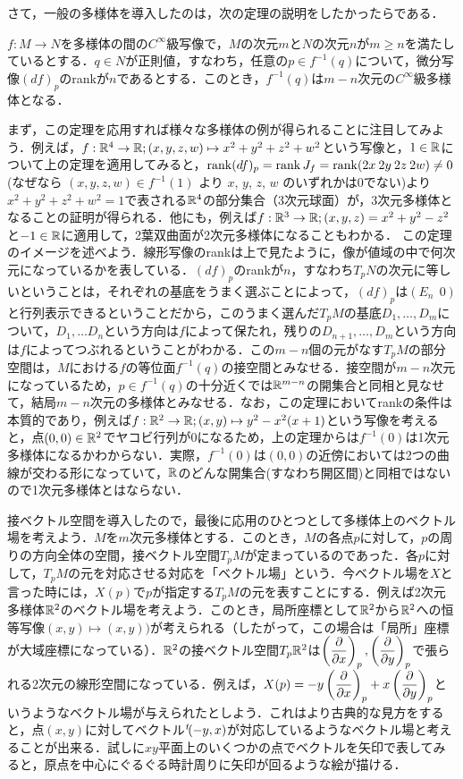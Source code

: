 さて，一般の多様体を導入したのは，次の定理の説明をしたかったらである．
\begin{s_theo}
$f:M\rightarrow N$を多様体の間の$C^\infty$級写像で，$M$の次元$m$と$N$の次元$n$が$m\ge n$を満たしているとする．$q\in N$が正則値，すなわち，任意の$p\in f^{-1}(q)$について，微分写像$(df)_p$のrankが$n$であるとする．このとき，$f^{-1}(q)$は$m-n$次元の$C^{\infty}$級多様体となる．
\end{s_theo}
まず，この定理を応用すれば様々な多様体の例が得られることに注目してみよう．例えば，$f:{\mathbb R}^4 \rightarrow {\mathbb R};(x,y,z,w)\mapsto x^2+y^2+z^2+w^2$という写像と，$1\in {\mathbb R}$について上の定理を適用してみると，$\operatorname{rank}(df)_p=\operatorname{rank} J_{f}=\operatorname{rank}(2x\:2y\:2z\:2w)\neq 0$ (なぜなら $(x,y,z,w)\in f^{-1}(1)$ より $x$, $y$, $z$, $w$ のいずれかは0でない)より$x^2+y^2+z^2+w^2=1$で表される${\mathbb R}^4$の部分集合（3次元球面）が，3次元多様体となることの証明が得られる．他にも，例えば$f:{\mathbb R}^3\rightarrow {\mathbb R};(x,y,z)=x^2+y^2-z^2$と$-1\in{\mathbb R}$に適用して，2葉双曲面が2次元多様体になることもわかる．
この定理のイメージを述べよう．線形写像のrankは上で見たように，像が値域の中で何次元になっているかを表している．$(df)_p$のrankが$n$，すなわち$T_pN$の次元に等しいということは，それぞれの基底をうまく選ぶことによって，$(df)_p$は$(E_n\:\:0)$と行列表示できるということだから，このうまく選んだ$T_pM$の基底$D_1,\dots,D_m$について，$D_1,\dots D_n$という方向は$f$によって保たれ，残りの$D_{n+1},\dots,D_m$という方向は$f$によってつぶれるということがわかる．この$m-n$個の元がなす$T_pM$の部分空間は，$M$における$f$の等位面$f^{-1}(q)$の接空間とみなせる．接空間が$m-n$次元になっているため，$p\in f^{-1}(q)$の十分近くでは${\mathbb R}^{m-n}$の開集合と同相と見なせて，結局$m-n$次元の多様体とみなせる．なお，この定理においてrankの条件は本質的であり，例えば$f:{\mathbb R}^2\rightarrow{\mathbb R};(x,y)\mapsto y^2-x^2(x+1)$という写像を考えると，点$(0,0)\in{\mathbb R}^2$でヤコビ行列が0になるため，上の定理からは$f^{-1}(0)$は1次元多様体になるかわからない．実際，$f^{-1}(0)$は$(0,0)$の近傍においては2つの曲線が交わる形になっていて，${\mathbb R}$のどんな開集合(すなわち開区間)と同相ではないので1次元多様体とはならない．


接ベクトル空間を導入したので，最後に応用のひとつとして多様体上のベクトル場を考えよう．$M$を$m$次元多様体とする．このとき，$M$の各点$p$に対して，$p$の周りの方向全体の空間，接ベクトル空間$T_pM$が定まっているのであった．各$p$に対して，$T_pM$の元を対応させる対応を「ベクトル場」という．今ベクトル場を$X$と言った時には，$X(p)$で$p$が指定する$T_pM$の元を表すことにする．例えば2次元多様体${\mathbb R}^2$のベクトル場を考えよう．このとき，局所座標として${\mathbb R}^2$から${\mathbb R}^2$への恒等写像$(x,y)\mapsto (x,y))$が考えられる（したがって，この場合は「局所」座標が大域座標になっている）．${\mathbb R}^2$の接ベクトル空間$T_p{\mathbb R}^2$は$\left(\dfrac{\partial}{\partial x}\right)_p,\left(\dfrac{\partial}{\partial y}\right)_p$で張られる2次元の線形空間になっている．例えば，$X(p)=-y\left(\dfrac{\partial}{\partial x}\right)_p+x\left(\dfrac{\partial}{\partial y}\right)_p$というようなベクトル場が与えられたとしよう．これはより古典的な見方をすると，点$(x,y)$に対してベクトル${}^t\!(-y,x)$が対応しているようなベクトル場と考えることが出来る．試しに$xy$平面上のいくつかの点でベクトルを矢印で表してみると，原点を中心にぐるぐる時計周りに矢印が回るような絵が描ける．



